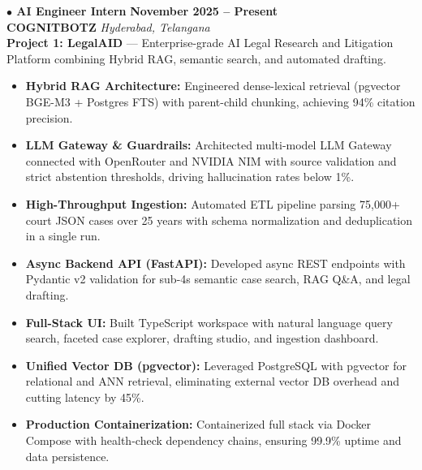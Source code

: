 \documentclass[a4paper,10pt]{article}
\begin{document}
\noindent
\textbf{\normalsize $\bullet$ AI Engineer Intern} \hfill \textbf{November 2025 -- Present} \\
\textbf{COGNITBOTZ} \hfill \textit{Hyderabad, Telangana} \\[2pt]

\noindent
\textbf{\color{projecttitle}Project 1: LegalAID} --- Enterprise-grade AI Legal Research and Litigation Platform combining Hybrid RAG, semantic search, and automated drafting.
\begin{itemize}
    \item \textbf{Hybrid RAG Architecture:} Engineered dense-lexical retrieval (pgvector BGE-M3 + Postgres FTS) with parent-child chunking, achieving 94\% citation precision.
    \item \textbf{LLM Gateway \& Guardrails:} Architected multi-model LLM Gateway connected with OpenRouter and NVIDIA NIM with source validation and strict abstention thresholds, driving hallucination rates below 1\%.
    \item \textbf{High-Throughput Ingestion:} Automated ETL pipeline parsing 75,000+ court JSON cases over 25 years with schema normalization and deduplication in a single run.
    \item \textbf{Async Backend API (FastAPI):} Developed async REST endpoints with Pydantic v2 validation for sub-4s semantic case search, RAG Q\&A, and legal drafting.
    \item \textbf{Full-Stack UI:} Built TypeScript workspace with natural language query search, faceted case explorer, drafting studio, and ingestion dashboard.
    \item \textbf{Unified Vector DB (pgvector):} Leveraged PostgreSQL with pgvector for relational and ANN retrieval, eliminating external vector DB overhead and cutting latency by 45\%.
    \item \textbf{Production Containerization:} Containerized full stack via Docker Compose with health-check dependency chains, ensuring 99.9\% uptime and data persistence.
\end{itemize}

\vspace{5pt}
\end{document}

